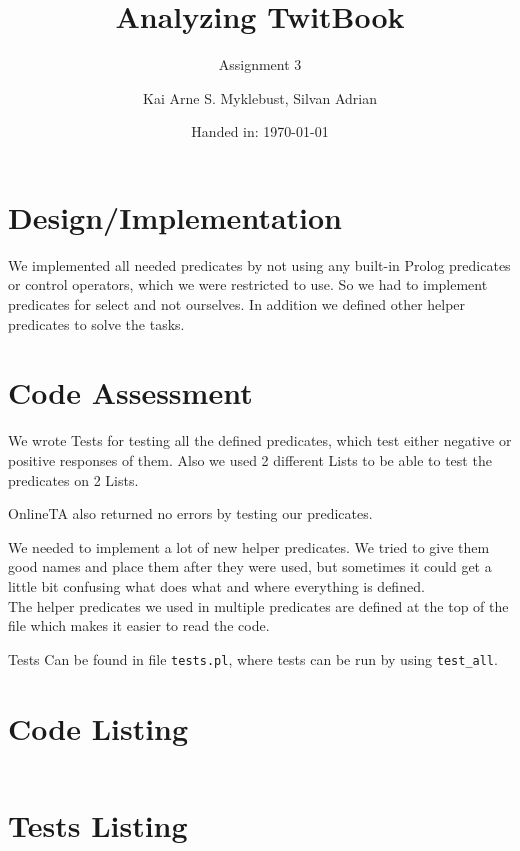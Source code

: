 \documentclass[12pt,a4paper]{article}
\begin{document}
\title{Analyzing TwitBook}
\subtitle{Assignment 3}

\author{Kai Arne S. Myklebust, Silvan Adrian}
\date{Handed in: \today}
	
\maketitle
\tableofcontents

\section{Design/Implementation}

We implemented all needed predicates by not using any built-in Prolog predicates or control operators, which we were restricted to use.
So we had to implement predicates for select and not ourselves. In addition we defined other helper predicates to solve the tasks.

\section{Code Assessment}
We wrote Tests for testing all the defined predicates, which test either negative or positive responses of them.
Also we used 2 different Lists to be able to test the predicates on 2 Lists.

OnlineTA also returned no errors by testing our predicates.

We needed to implement a lot of new helper predicates. We tried to give them good names and place them after they were used, but sometimes it could get a little bit confusing what does what and where everything is defined.\\
The helper predicates we used in multiple predicates are defined at the top of the file which makes it easier to read the code.

Tests Can be found in file \texttt{tests.pl}, where tests can be run by using \texttt{test\_all}.


\appendix
\section{Code Listing}
\inputminted{prolog}{handin/twitbook.pl}

\section{Tests Listing}
\inputminted{prolog}{handin/tests.pl}
\end{document}
